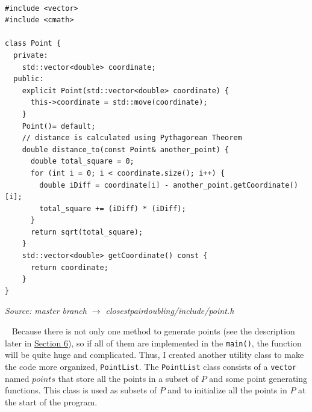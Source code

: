\documentclass[12pt,english,]{article}
\newcommand{\code}[1]{\colorbox{light-gray}{\texttt{#1}}}
\begin{document}
~

\begin{lstlisting}
#include <vector>
#include <cmath>

class Point {
  private:
    std::vector<double> coordinate;
  public:
    explicit Point(std::vector<double> coordinate) {
      this->coordinate = std::move(coordinate);
    }
    Point()= default;
    // distance is calculated using Pythagorean Theorem
    double distance_to(const Point& another_point) {
      double total_square = 0;
      for (int i = 0; i < coordinate.size(); i++) {
        double iDiff = coordinate[i] - another_point.getCoordinate()[i];
        total_square += (iDiff) * (iDiff);
      }
      return sqrt(total_square);
    }
    std::vector<double> getCoordinate() const {
      return coordinate;
    }
}
\end{lstlisting}
\vspace{-9truemm}
\begin{minipage}{1\textwidth}
  \begin{flushright}
  {\footnotesize \emph{Source: master branch $\rightarrow$ closestpairdoubling/include/point.h}\par}
  \end{flushright}
\end{minipage}
\vspace{0.5truemm}

~ Because there is not only one method to generate points (see the
description later in \protect\hyperlink{section6}{Section 6}), so if all
of them are implemented in the \code{main()}, the function will be quite
huge and complicated. Thus, I created another utility class to make the
code more organized, \code{PointList}. The \code{PointList} class
consists of a \code{vector} named \(points\) that store all the points
in a subset of \(P\) and some point generating functions. This class is
used as subsets of \(P\) and to initialize all the points in \(P\) at
the start of the program.

~
\end{document}
